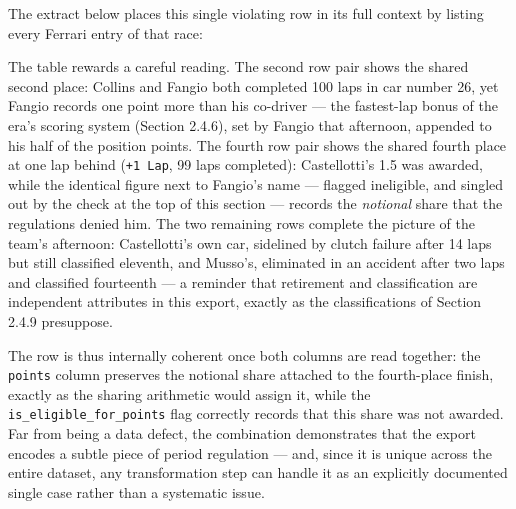 \documentclass[
]{article}
\begin{document}
The extract below places this single violating row in its full context
by listing every Ferrari entry of that race:

\begin{table}[!h]
\centering\begingroup\fontsize{8}{10}\selectfont

\endgroup{}
\end{table}

The table rewards a careful reading. The second row pair shows the
shared second place: Collins and Fangio both completed 100 laps in car
number 26, yet Fangio records one point more than his co-driver --- the
fastest-lap bonus of the era's scoring system (Section 2.4.6), set by
Fangio that afternoon, appended to his half of the position points. The
fourth row pair shows the shared fourth place at one lap behind
(\texttt{+1\ Lap}, 99 laps completed): Castellotti's 1.5 was awarded,
while the identical figure next to Fangio's name --- flagged ineligible,
and singled out by the check at the top of this section --- records the
\emph{notional} share that the regulations denied him. The two remaining
rows complete the picture of the team's afternoon: Castellotti's own
car, sidelined by clutch failure after 14 laps but still classified
eleventh, and Musso's, eliminated in an accident after two laps and
classified fourteenth --- a reminder that retirement and classification
are independent attributes in this export, exactly as the
classifications of Section 2.4.9 presuppose.

The row is thus internally coherent once both columns are read together:
the \texttt{points} column preserves the notional share attached to the
fourth-place finish, exactly as the sharing arithmetic would assign it,
while the \texttt{is\_eligible\_for\_points} flag correctly records that
this share was not awarded. Far from being a data defect, the
combination demonstrates that the export encodes a subtle piece of
period regulation --- and, since it is unique across the entire dataset,
any transformation step can handle it as an explicitly documented single
case rather than a systematic issue.
\end{document}
